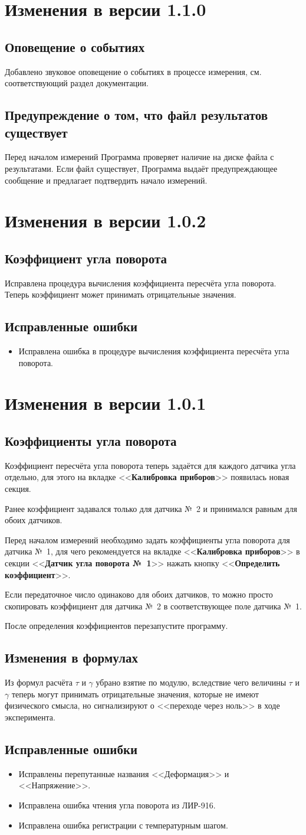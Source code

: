 \documentclass[12pt, a4paper]{article}
\newcommand{\CTRL}[1]{<<{\bf #1}>>}
\newcommand{\VERSION}[1]{\section*{Изменения в версии #1}}
\newcommand{\ITEM}[1]{\subsection*{#1}}
\newcommand{\FIXEDERRORS}{\subsection*{Исправленные ошибки}}
\begin{document}
\VERSION{1.1.0}

\ITEM{Оповещение о событиях}

Добавлено звуковое оповещение о событиях в процессе измерения, см. соответствующий раздел документации.

\ITEM{Предупреждение о том, что файл результатов существует}

Перед началом измерений Программа проверяет наличие на диске файла с результатами. Если файл существует, Программа выдаёт предупреждающее сообщение и предлагает подтвердить начало измерений.

\VERSION{1.0.2}

\ITEM{Коэффициент угла поворота}

Исправлена процедура вычисления коэффициента пересчёта угла поворота. Теперь коэффициент может принимать отрицательные значения.

\FIXEDERRORS

\begin{itemize}
\item Исправлена ошибка в процедуре вычисления коэффициента пересчёта угла поворота.
\end{itemize}

\VERSION{1.0.1}

\ITEM{Коэффициенты угла поворота}

Коэффициент пересчёта угла поворота теперь задаётся для каждого датчика угла отдельно, для этого на вкладке \CTRL{Калибровка приборов} появилась новая секция.

Ранее коэффициент задавался только для датчика №~2 и принимался равным для обоих датчиков.

Перед началом измерений необходимо задать коэффициенты угла поворота для датчика №~1, для чего рекомендуется на вкладке \CTRL{Калибровка приборов} в секции \CTRL{Датчик угла поворота №~1} нажать кнопку \CTRL{Определить коэффициент}.

Если передаточное число одинаково для обоих датчиков, то можно просто скопировать коэффициент для датчика №~2 в соответствующее поле датчика №~1.

После определения коэффициентов перезапустите программу.

\ITEM{Изменения в формулах}

Из формул расчёта $\tau$ и $\gamma$ убрано взятие по модулю, вследствие чего величины $\tau$ и $\gamma$ теперь могут принимать отрицательные значения, которые не имеют физического смысла, но сигнализируют о <<переходе через ноль>> в ходе эксперимента.

\FIXEDERRORS

\begin{itemize}
\item Исправлены перепутанные названия <<Деформация>> и <<Напряжение>>.
\item Исправлена ошибка чтения угла поворота из ЛИР-916.
\item Исправлена ошибка регистрации с температурным шагом.
\end{itemize}
\end{document}

